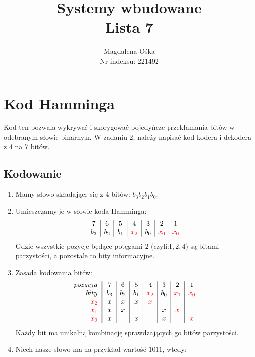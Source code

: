 \documentclass[a4paper,11pt]{article}
\title {\Huge{Systemy wbudowane}
	\\ \Large{Lista 7}}
\author {Magdalena Ośka
	\\ {Nr indeksu: 221492}}
\begin{document}
	\maketitle
	\section{Kod Hamminga}
	Kod ten pozwala wykrywać i skorygować pojedyńcze przekłamania bitów w odebranym słowie binarnym. W zadaniu 2, należy napisać kod kodera i dekodera z 4 na 7 bitów. 
		\subsection{Kodowanie}
		\begin{enumerate}
			\item Mamy słowo składające się z 4 bitów: ${b_{3}b_{2}b_{1}b_{0}}$.
			\item Umieszczamy je w słowie koda Hamminga: \\
				\begin{displaymath}
				\begin{array}{c|c|c|c|c|c|c}
					7 & 6 & 5 & 4 & 3 & 2 & 1 \\
					b_{3} & b_{2} & b_{1} & \color{red}x_{2} & b_{0} &\color{red} x_{0}& \color{red}x_{0} \\
				\end{array}
				\end{displaymath}
				Gdzie wszystkie pozycje będące potęgami $2$ (czyli:$1,2,4$) są bitami parzystości, a pozostałe to bity informacyjne.
			\item Zasada kodowania bitów:
				\begin{displaymath}
				\begin{array}{r||c|c|c|c|c|c|c}
				pozycja & 7 & 6 & 5 & 4 & 3 & 2 & 1 \\
				bity& b_{3} & b_{2} & b_{1} & \color{red}x_{2} & b_{0} &\color{red} x_{1}& \color{red}x_{0}  \\
				\color{red} x_{2} & x & x & x & \color{red} x & & & \\
				\color{red} x_{1} & x & x & & & x & \color{red}x & \\
				\color{red} x_{0} & x & & x & & x & &\color{red} x \\
				\end{array}
				\end{displaymath}
				Każdy bit ma unikalną kombinację sprawdzających go bitów parzystości.
			\item Niech nasze słowo ma na przykład wartość $1011$, wtedy: 				

\end{enumerate}
\end{document}
